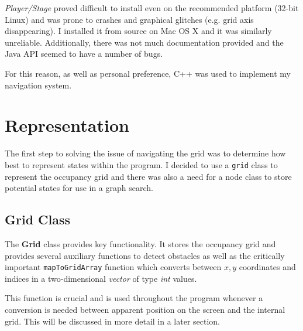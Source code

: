 \documentclass[a4paper,12pt]{article}
\begin{document}
\textit{Player/Stage} proved difficult to install even on the recommended platform (32-bit Linux) and was prone to crashes and graphical glitches (e.g. grid axis disappearing). I installed it from source on Mac OS X and it was similarly unreliable. Additionally, there was not much documentation provided and the Java API seemed to have a number of bugs. 

For this reason, as well as personal preference, C++ was used to implement my navigation system.
\section{Representation}
The first step to solving the issue of navigating the grid was to determine how best to represent states within the program. I decided to use a \texttt{grid} class to represent the occupancy grid and there was also a need for a node class to store potential states for use in a graph search. 
\subsection{Grid Class}
The \textbf{Grid} class provides key functionality. It stores the occupancy grid and provides several auxiliary functions to detect obstacles as well as the critically important \texttt{mapToGridArray} function which converts between $x,y$ coordinates and indices in a two-dimensional \textit{vector} of type \textit{int} values. 

This function is crucial and is used throughout the program whenever a conversion is needed between apparent position on the screen and the internal grid. This will be discussed in more detail in a later section.
\end{document}
